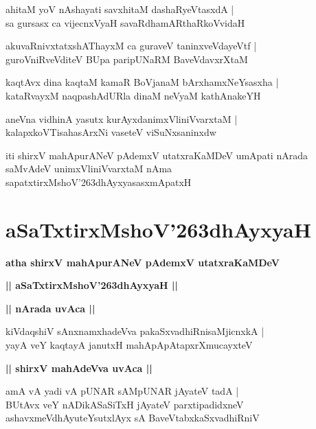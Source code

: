 \documentclass[twoside,12pt,openright]{book}
\def\S{\char'263}
\newcounter{shloka}[chapter]
\def\uvaca#1{\centerline{{\large\textbf{#1}}}}
\begin{document}
\begin{shloka}%
ahitaM yoV nAshayati savxhitaM dashaRyeVtasxdA |\\
sa gursasx ca vijecnxVyaH savaRdhamARthaRkoVvidaH 
\end{shloka}

\begin{shloka}%
akuvaRnivxtatxshAThayxM ca guraveV taninxveVdayeVtf |\\
guroVniRveVditeV BUpa paripUNaRM BaveVdavxrXtaM 
\end{shloka}

\begin{shloka}%
kaqtAvx dina kaqtaM kamaR BoVjanaM bArxhamxNeYsasxha |\\
kataRvayxM naqpashAdURla dinaM neVyaM kathAnakeYH 
\end{shloka}

\begin{shloka}%
aneVna vidhinA yasutx kurAyxdanimxVliniVvarxtaM |\\
kalapxkoVTisahasArxNi vaseteV viSuNxsaninxdw
\end{shloka}

\begin{center}
iti shirxV mahApurANeV pAdemxV utatxraKaMDeV umApati nArada saMvAdeV  
unimxVliniVvarxtaM nAma sapatxtirxMshoV\S dhAyxyasasxmApatxH 
\end{center}

\chapter{aSaTxtirxMshoV\S dhAyxyaH}

\begin{center}
{\LARGE\bfseries atha shirxV mahApurANeV pAdemxV utatxraKaMDeV}
\end{center}

\begin{center}
{\LARGE\bfseries || aSaTxtirxMshoV\S dhAyxyaH ||}
\end{center}

\uvaca{|| nArada uvAca ||}

\begin{shloka}%
kiVdaqshiV sAnxnamxhadeVva pakaSxvadhiRnisaMjicnxkA |\\
yayA veY kaqtayA janutxH mahApApAtapxrXmucayxteV 
\end{shloka}

\uvaca{|| shirxV mahAdeVva uvAca ||}

\begin{shloka}%
amA vA yadi vA pUNAR sAMpUNAR jAyateV tadA |\\
BUtAvx veY nADikASaSiTxH jAyateV parxtipadidxneV \\
ashavxmeVdhAyuteYsutxlAyx sA BaveVtabxkaSxvadhiRniV
\end{shloka}
\end{document}
